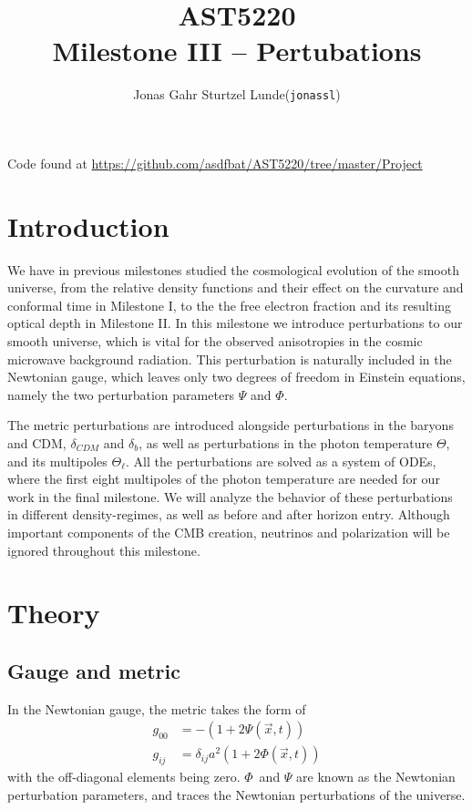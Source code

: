 \documentclass[10pt, a4paper]{article}
\begin{document}
\title{AST5220\\ Milestone III -- Pertubations}
\author{
    \begin{tabular}{r l}
        Jonas Gahr Sturtzel Lunde & (\texttt{jonassl})
    \end{tabular}}

\maketitle
Code found at \url{https://github.com/asdfbat/AST5220/tree/master/Project}
\vspace{0.7cm}

\section{Introduction}
We have in previous milestones studied the cosmological evolution of the smooth universe, from the relative density functions and their effect on the curvature and conformal time in Milestone I, to the the free electron fraction and its resulting optical depth in Milestone II. In this milestone we introduce perturbations to our smooth universe, which is vital for the observed anisotropies in the cosmic microwave background radiation. This perturbation is naturally included in the Newtonian gauge, which leaves only two degrees of freedom in Einstein equations, namely the two perturbation parameters $\Psi$ and $\Phi$.

The metric perturbations are introduced alongside perturbations in the baryons and CDM, $\delta_{CDM}$ and $\delta_{b}$, as well as perturbations in the photon temperature $\Theta$, and its multipoles $\Theta_\ell$. All the perturbations are solved as a system of ODEs, where the first eight multipoles of the photon temperature are needed for our work in the final milestone. We will analyze the behavior of these perturbations in different density-regimes, as well as before and after horizon entry. Although important components of the CMB creation, neutrinos and polarization will be ignored throughout this milestone.


\section{Theory}
\subsection{Gauge and metric}
In the Newtonian gauge, the metric takes the form of
\begin{equation}
    \begin{aligned}
        g_{00} &= - (1 + 2\Psi(\vec x,t)) \\ 
        g_{ij} &= \delta_{ij}a^2(1 + 2\Phi(\vec x, t))
    \end{aligned}
\end{equation}
with the off-diagonal elements being zero. $\Phi$ and $\Psi$ are known as the Newtonian perturbation parameters, and traces the Newtonian perturbations of the universe.
\end{document}

